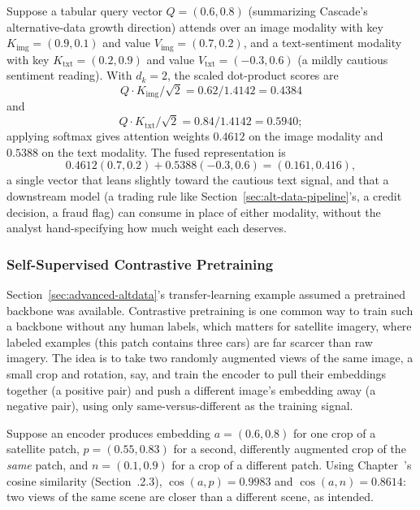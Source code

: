 \documentclass[../ai_in_finance]{subfiles}
\begin{document}
Suppose a tabular query vector $Q = (0.6, 0.8)$ (summarizing Cascade's alternative-data growth direction) attends over an image modality with key $K_{\text{img}} = (0.9, 0.1)$ and value $V_{\text{img}} = (0.7, 0.2)$, and a text-sentiment modality with key $K_{\text{txt}} = (0.2, 0.9)$ and value $V_{\text{txt}} = (-0.3, 0.6)$ (a mildly cautious sentiment reading). With $d_k = 2$, the scaled dot-product scores are
$$Q \cdot K_{\text{img}}/\sqrt{2} = 0.62/1.4142 = 0.4384$$
and
$$Q \cdot K_{\text{txt}}/\sqrt{2} = 0.84/1.4142 = 0.5940;$$
applying softmax gives attention weights $0.4612$ on the image modality and $0.5388$ on the text modality. The fused representation is
$$0.4612(0.7,0.2) + 0.5388(-0.3,0.6) = (0.161, 0.416),$$
a single vector that leans slightly toward the cautious text signal, and that a downstream model (a trading rule like Section~\ref{sec:alt-data-pipeline}'s, a credit decision, a fraud flag) can consume in place of either modality, without the analyst hand-specifying how much weight each deserves.

\subsubsection*{Self-Supervised Contrastive Pretraining}

Section~\ref{sec:advanced-altdata}'s transfer-learning example assumed a pretrained backbone was available. Contrastive pretraining is one common way to train such a backbone without any human labels, which matters for satellite imagery, where labeled examples (this patch contains three cars) are far scarcer than raw imagery. The idea is to take two randomly augmented views of the same image, a small crop and rotation, say, and train the encoder to pull their embeddings together (a positive pair) and push a different image's embedding away (a negative pair), using only same-versus-different as the training signal.

Suppose an encoder produces embedding $a = (0.6, 0.8)$ for one crop of a satellite patch, $p = (0.55, 0.83)$ for a second, differently augmented crop of the \emph{same} patch, and $n = (0.1, 0.9)$ for a crop of a different patch. Using Chapter~'s cosine similarity (Section~.2.3), $\cos(a,p) = 0.9983$ and $\cos(a,n) = 0.8614$: two views of the same scene are closer than a different scene, as intended.
\end{document}
